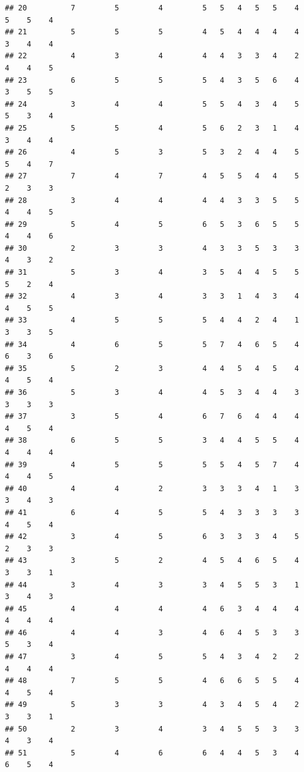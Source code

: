 \documentclass[
]{article}
\begin{document}
\begin{verbatim}
## 20          7         5         4         5   5   4   5   5    4    5    5    4
## 21          5         5         5         4   5   4   4   4    4    3    4    4
## 22          4         3         4         4   4   3   3   4    2    4    4    5
## 23          6         5         5         5   4   3   5   6    4    3    5    5
## 24          3         4         4         5   5   4   3   4    5    5    3    4
## 25          5         5         4         5   6   2   3   1    4    3    4    4
## 26          4         5         3         5   3   2   4   4    5    5    4    7
## 27          7         4         7         4   5   5   4   4    5    2    3    3
## 28          3         4         4         4   4   3   3   5    5    4    4    5
## 29          5         4         5         6   5   3   6   5    5    4    4    6
## 30          2         3         3         4   3   3   5   3    3    4    3    2
## 31          5         3         4         3   5   4   4   5    5    5    2    4
## 32          4         3         4         3   3   1   4   3    4    4    5    5
## 33          4         5         5         5   4   4   2   4    1    3    3    5
## 34          4         6         5         5   7   4   6   5    4    6    3    6
## 35          5         2         3         4   4   5   4   5    4    4    5    4
## 36          5         3         4         4   5   3   4   4    3    3    3    3
## 37          3         5         4         6   7   6   4   4    4    4    5    4
## 38          6         5         5         3   4   4   5   5    4    4    4    4
## 39          4         5         5         5   5   4   5   7    4    4    4    5
## 40          4         4         2         3   3   3   4   1    3    3    4    3
## 41          6         4         5         5   4   3   3   3    3    4    5    4
## 42          3         4         5         6   3   3   3   4    5    2    3    3
## 43          3         5         2         4   5   4   6   5    4    3    3    1
## 44          3         4         3         3   4   5   5   3    1    3    4    3
## 45          4         4         4         4   6   3   4   4    4    4    4    4
## 46          4         4         3         4   6   4   5   3    3    5    3    4
## 47          3         4         5         5   4   3   4   2    2    4    4    4
## 48          7         5         5         4   6   6   5   5    4    4    5    4
## 49          5         3         3         4   3   4   5   4    2    3    3    1
## 50          2         3         4         3   4   5   5   3    3    4    3    4
## 51          5         4         6         6   4   4   5   3    4    6    5    4

\end{verbatim}
\end{document}
